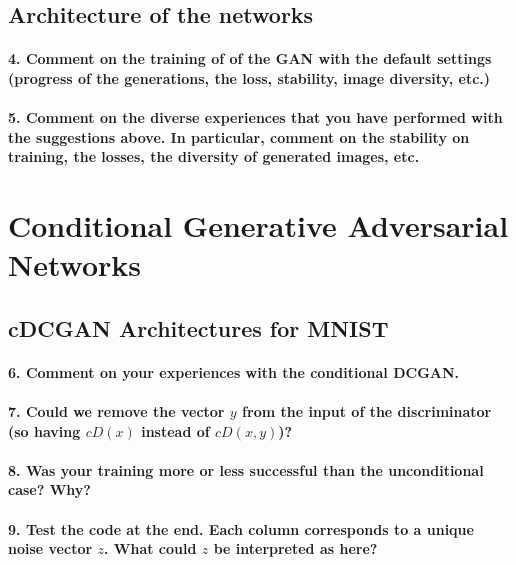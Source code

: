 \subsection{Architecture of the networks}

\paragraph*{4. Comment on the training of of the GAN with the default settings (progress of the generations, the loss, stability, image diversity, etc.)}

\paragraph*{5. Comment on the diverse experiences that you have performed with the suggestions above. In particular, comment on the stability on training, the losses, the diversity of generated images, etc.}

\section{Conditional Generative Adversarial Networks}


\subsection{cDCGAN Architectures for MNIST}


\paragraph*{6. Comment on your experiences with the conditional DCGAN.}

\paragraph*{7. Could we remove the vector $y$ from the input of the discriminator (so having $cD(x)$ instead of $cD(x, y)$)?}


\paragraph*{8. Was your training more or less successful than the unconditional case? Why?}

\paragraph*{9. Test the code at the end. Each column corresponds to a unique noise vector $z$. What could $z$ be interpreted as here?}

